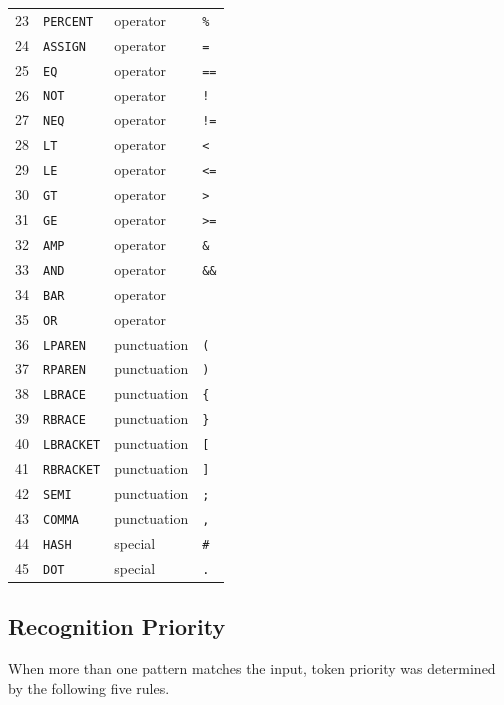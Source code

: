 \documentclass[12pt,letterpaper]{article}
\newcommand{\cd}[1]{\texttt{#1}}                       %
\begin{document}
\begin{center}
\begin{longtable}{@{}r l l p{6.6cm}@{}}
23 & \cd{PERCENT}     & operator    & \cd{\%} \\
24 & \cd{ASSIGN}      & operator    & \cd{=} \\
25 & \cd{EQ}          & operator    & \cd{==} \\
26 & \cd{NOT}         & operator    & \cd{!} \\
27 & \cd{NEQ}         & operator    & \cd{!=} \\
28 & \cd{LT}          & operator    & \cd{<} \\
29 & \cd{LE}          & operator    & \cd{<=} \\
30 & \cd{GT}          & operator    & \cd{>} \\
31 & \cd{GE}          & operator    & \cd{>=} \\
32 & \cd{AMP}         & operator    & \cd{\&} \\
33 & \cd{AND}         & operator    & \cd{\&\&} \\
34 & \cd{BAR}         & operator    & \cd{\textbar} \\
35 & \cd{OR}          & operator    & \cd{\textbar\textbar} \\
36 & \cd{LPAREN}      & punctuation & \cd{(} \\
37 & \cd{RPAREN}      & punctuation & \cd{)} \\
38 & \cd{LBRACE}      & punctuation & \cd{\{} \\
39 & \cd{RBRACE}      & punctuation & \cd{\}} \\
40 & \cd{LBRACKET}    & punctuation & \cd{[} \\
41 & \cd{RBRACKET}    & punctuation & \cd{]} \\
42 & \cd{SEMI}        & punctuation & \cd{;} \\
43 & \cd{COMMA}       & punctuation & \cd{,} \\
44 & \cd{HASH}        & special     & \cd{\#} \\
45 & \cd{DOT}         & special     & \cd{.} \\
\end{longtable}



\end{center}

\subsection{Recognition Priority}
When more than one pattern matches the input, token priority was determined by the following five rules.
\end{document}
